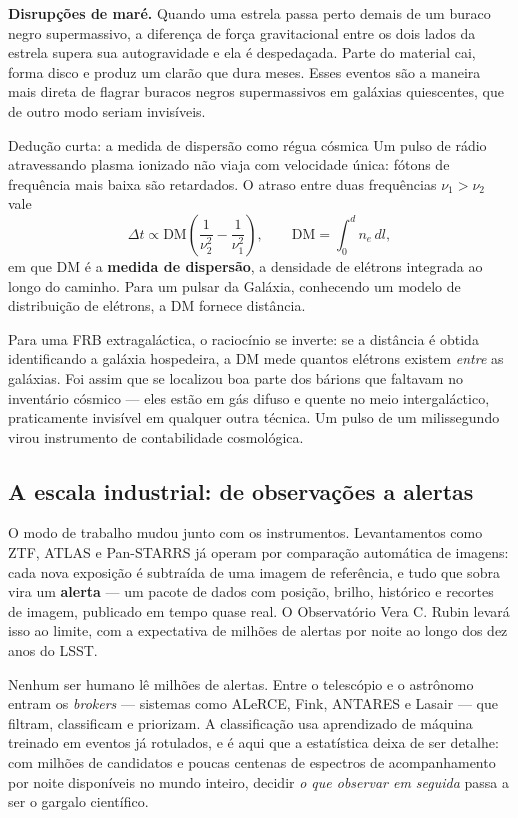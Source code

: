 \documentclass[11pt,a4paper]{article}
\begin{document}
\textbf{Disrupções de maré.} Quando uma estrela passa perto demais de um buraco negro supermassivo, a diferença de força gravitacional entre os dois lados da estrela supera sua autogravidade e ela é despedaçada. Parte do material cai, forma disco e produz um clarão que dura meses. Esses eventos são a maneira mais direta de flagrar buracos negros supermassivos em galáxias quiescentes, que de outro modo seriam invisíveis.

\begin{lessonblock}[borderline west={2pt}{0pt}{astroGold}]{Dedução curta: a medida de dispersão como régua cósmica}
Um pulso de rádio atravessando plasma ionizado não viaja com velocidade única: fótons de frequência mais baixa são retardados. O atraso entre duas frequências $\nu_1>\nu_2$ vale
\[
\Delta t\propto \mathrm{DM}\left(\frac{1}{\nu_2^{2}}-\frac{1}{\nu_1^{2}}\right),\qquad
\mathrm{DM}=\int_0^{d} n_e\,dl,
\]
em que $\mathrm{DM}$ é a \textbf{medida de dispersão}, a densidade de elétrons integrada ao longo do caminho. Para um pulsar da Galáxia, conhecendo um modelo de distribuição de elétrons, a DM fornece distância.

Para uma FRB extragaláctica, o raciocínio se inverte: se a distância é obtida identificando a galáxia hospedeira, a DM mede quantos elétrons existem \emph{entre} as galáxias. Foi assim que se localizou boa parte dos bárions que faltavam no inventário cósmico --- eles estão em gás difuso e quente no meio intergaláctico, praticamente invisível em qualquer outra técnica. Um pulso de um milissegundo virou instrumento de contabilidade cosmológica.
\end{lessonblock}

\subsection*{A escala industrial: de observações a alertas}

O modo de trabalho mudou junto com os instrumentos. Levantamentos como ZTF, ATLAS e Pan-STARRS já operam por comparação automática de imagens: cada nova exposição é subtraída de uma imagem de referência, e tudo que sobra vira um \textbf{alerta} --- um pacote de dados com posição, brilho, histórico e recortes de imagem, publicado em tempo quase real. O Observatório Vera C. Rubin levará isso ao limite, com a expectativa de milhões de alertas por noite ao longo dos dez anos do LSST.

Nenhum ser humano lê milhões de alertas. Entre o telescópio e o astrônomo entram os \textit{brokers} --- sistemas como ALeRCE, Fink, ANTARES e Lasair --- que filtram, classificam e priorizam. A classificação usa aprendizado de máquina treinado em eventos já rotulados, e é aqui que a estatística deixa de ser detalhe: com milhões de candidatos e poucas centenas de espectros de acompanhamento por noite disponíveis no mundo inteiro, decidir \emph{o que observar em seguida} passa a ser o gargalo científico.
\end{document}
